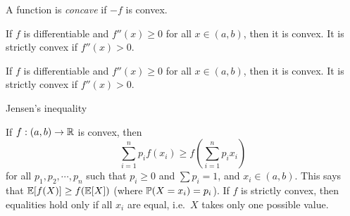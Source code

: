 \begin{note}
\begin{field}
\begin{defi}
\begin{center}
      \end{center}
      A function is \emph{concave} if $-f$ is convex.
    \end{defi}
  \end{field}
  \xplain{}%
\end{note}

\begin{note}
  \begin{field}
    \begin{prop}
      If $f$ is differentiable and $f''(x) \geq 0$ for all $x\in (a, b)$, then it is convex. It is strictly convex if $f''(x) > 0$.
    \end{prop}
  \end{field}
  \begin{field}
    \begin{prop}
      If $f$ is differentiable and $f''(x) \geq 0$ for all $x\in (a, b)$, then it is convex. It is strictly convex if $f''(x) > 0$.
    \end{prop}
  \end{field}
  \xplain{}%
\end{note}

%
\begin{note}
  \begin{field}
    Jensen's inequality
  \end{field}
  \begin{field}
    \begin{thm}
      If $f:(a, b) \to \R$ is convex, then
      \[
        \sum_{i = 1}^n p_i f(x_i) \geq f\left(\sum_{i = 1}^n p_ix_i\right)
      \]
      for all $p_1, p_2, \cdots, p_n$ such that $p_i \geq 0$ and $\sum p_i = 1$, and $x_i \in (a, b)$.
      This says that $\E[f(X)] \geq f(\E[X])$ (where $\P(X=x_i) = p_i$).
      If $f$ is strictly convex, then equalities hold only if all $x_i$ are equal, i.e.\ $X$ takes only one possible value.
    \end{thm}
  \end{field}
  \xplain{}%
\end{note}

